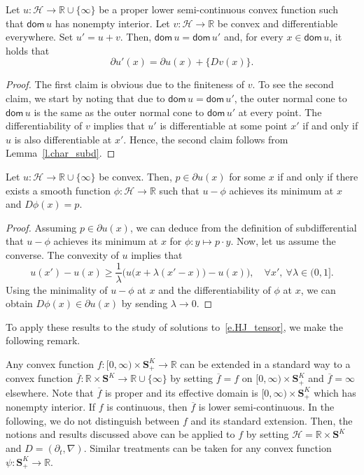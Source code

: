 \documentclass[AHL,Unicode,longabstracts,published]{cedram}
\newcommand{\R}{\mathbb{R}}
\renewcommand{\S}{\mathbf{S}}
\newcommand{\dom}{\mathsf{dom}}
\newcommand{\scH}{\mathscr{H}}
\renewcommand{\geq}{\geqslant}
\renewcommand{\bar}{\overline}
\let\oldforall\forall
\renewcommand*{\forall}{\mathrel{\oldforall}}
\begin{document}
\begin{lemm}\label{l.convex+diff}
Let $u:\scH\to \R\cup\{\infty\}$ be a proper lower semi-continuous convex function such that $\dom\, u$ has nonempty interior. Let $v:\scH\to \R$ be convex and differentiable everywhere. Set $u'=u+v$. Then, $\dom\, u=\dom\, u'$ and, for every $x\in \dom\, u$, it holds that
\[
\partial u'(x) = \partial u(x) +\big\{Dv(x)\big\}.
\]
\begin{proof}
The first claim is obvious due to the finiteness of $v$. To see the second claim, we start by noting that due to $\dom\, u=\dom\, u'$, the outer normal cone to $\dom\, u$ is the same as the outer normal cone to $\dom\, u'$ at every point. The differentiability of $v$ implies that $u'$ is differentiable at some point $x'$ if and only if $u$ is also differentiable at $x'$. Hence, the second claim follows from Lemma~\ref{l.char_subd}.
\end{proof}
\end{lemm}

\begin{lemm}\label{l.subsol_subd}
Let $u:\scH\to \R\cup\{\infty\}$ be convex. Then, $p \in \partial u(x)$ for some $x$ if and only if there exists a smooth function $\phi:\scH\to \R$ such that $u-\phi$ achieves its minimum at $x$ and $D\phi(x) = p$.
\end{lemm}


\begin{proof}
Assuming $p\in\partial u(x)$, we can deduce from the definition of subdifferential that $u-\phi$ achieves {its} minimum at $x$ for $\phi:y\mapsto p\cdot y$. Now, let us assume the converse. The convexity of $u$ implies that
\[
u(x') -u(x) \geq \frac{1}{\lambda}\Big(u\big(x+\lambda\left(x'-x\right)\big)-u(x)\Big),\quad\forall x',\ \forall \lambda \in(0,1].
\]
Using the minimality of $u-\phi$ at $x$ and the differentiability of $\phi$ at $x$, we can obtain $D\phi(x)\in\partial u(x)$ by sending $\lambda \to 0$.
\end{proof}

To apply these results to the study of solutions to~\eqref{e.HJ_tensor}, we make the following remark.

\begin{rema}\label{r.extension}
Any convex function $f:[0,\infty)\times\S^K_+\to\R$ can be extended in a standard way to a convex function $\bar f:\R\times \S^K\to \R\cup\{\infty\}$ by setting $\bar f = f$ on $[0,\infty)\times\S^K_+$ and $\bar f = \infty$ elsewhere. Note that $\bar f$ is proper and its effective domain is $[0,\infty)\times\S^K_+$ which has nonempty interior. If $f$ is continuous, then $\bar f$ is lower semi-continuous. In the following, we do not distinguish between $f$ and its standard extension. Then, the notions and results discussed above can be applied to $f$ by setting $\scH= \R\times \S^K$ and $D = (\partial_t,\nabla)$. Similar treatments can be taken for any convex function $\psi: \S^K_+\to \R$.
\end{rema}
\end{document}
